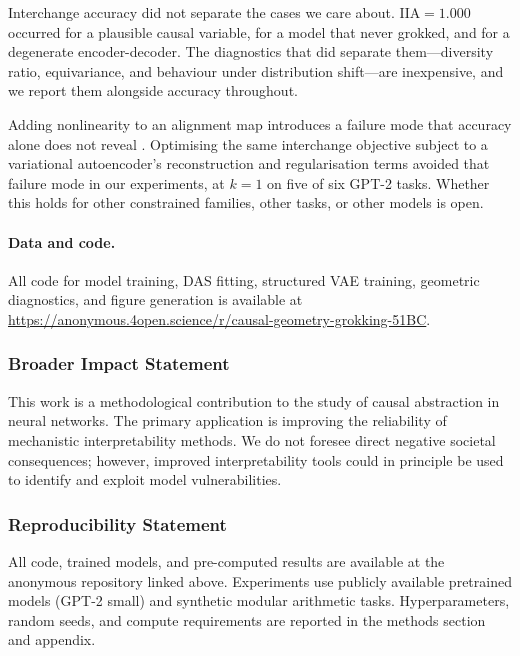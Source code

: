 \documentclass{article}
\newcommand{\IIA}{\mathrm{IIA}}
\begin{document}
Interchange accuracy did not separate the cases we care about. $\IIA = 1.000$
occurred for a plausible causal variable, for a model that never grokked, and for
a degenerate encoder-decoder. The diagnostics that did separate them---diversity
ratio, equivariance, and behaviour under distribution shift---are inexpensive, and
we report them alongside accuracy throughout.

Adding nonlinearity to an alignment map introduces a failure mode that accuracy
alone does not reveal \citep{sutter2025nonlinear}. Optimising the same
interchange objective subject to a variational autoencoder's reconstruction and
regularisation terms avoided that failure mode in our experiments, at $k = 1$ on
five of six GPT-2 tasks. Whether this holds for other constrained families,
other tasks, or other models is open.

\paragraph{Data and code.} All code for model training, DAS fitting, structured
VAE training, geometric diagnostics, and figure generation is available at
\url{https://anonymous.4open.science/r/causal-geometry-grokking-51BC}.

\subsubsection*{Broader Impact Statement}
This work is a methodological contribution to the study of causal abstraction
in neural networks. The primary application is improving the reliability of
mechanistic interpretability methods. We do not foresee direct negative
societal consequences; however, improved interpretability tools could in
principle be used to identify and exploit model vulnerabilities.

\subsubsection*{Reproducibility Statement}
All code, trained models, and pre-computed results are available at the
anonymous repository linked above. Experiments use publicly available
pretrained models (GPT-2 small) and synthetic modular arithmetic tasks.
Hyperparameters, random seeds, and compute requirements are reported in
the methods section and appendix.

%




\clearpage
\appendix

\end{document}
